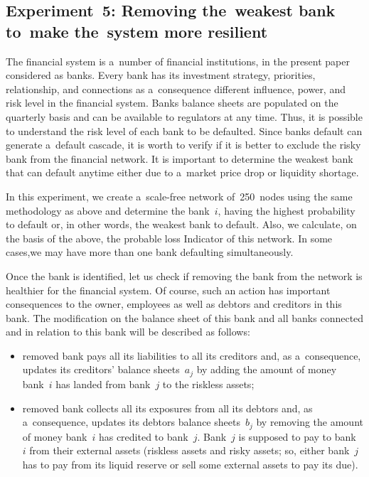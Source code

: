 \begin{multicols}{2}
   


\subsection{Experiment~5:  Removing the~weakest bank to~make the~system more 
resilient} 

\noindent
The financial system is a~number of financial institutions, in the present paper 
considered as banks. Every bank has its investment strategy, priorities, 
relationship, and connections as a~consequence different influence, power, and 
risk level in the financial system.
Banks balance sheets are populated on the quarterly basis and can be available 
to regulators at any time. Thus, it is possible to understand the risk level of 
each bank to be defaulted. Since banks default can generate a~default cascade, 
it is worth to verify if it is better to exclude the risky bank from the 
financial network.  It is important to determine  the weakest bank that can 
default anytime either due to a~market price drop or liquidity shortage.

In this experiment, we create a~scale-free network of~250~nodes using the same 
methodology as above and determine the bank~$i$, having the highest probability 
to default or, in other words, the weakest bank to default. Also, we calculate, 
on the  basis of the above, the probable loss Indicator of this network. In some 
cases,\linebreak we may have more than one bank defaulting simultaneously.  


Once the bank is identified, let us check if removing the bank from the 
network is healthier for the financial system.  Of course, such an action has 
important  consequences to the owner, employees as well as debtors and creditors 
in this bank.  The modification on  the balance sheet of this bank 
and all banks connected and in relation to this bank will be described as follows:
\begin{itemize}
\item removed bank pays all its liabilities to all its creditors and, as 
a~consequence, updates its creditors' balance sheets~$a_j$ by adding the amount 
of money bank~$i$ has landed from bank~$j$ to the riskless assets;

\item removed bank collects all its exposures from all its debtors and, as 
a~consequence, updates its debtors balance sheets~$b_j$ by removing the amount of 
money bank~$i$ has credited to bank~$j$. Bank~$j$ is supposed to pay to bank~$i$ 
from their external assets (riskless assets and risky assets; so, either bank~$j$ 
has to pay from its liquid reserve or sell some external assets to pay its due).
\end{itemize}


\end{multicols}
